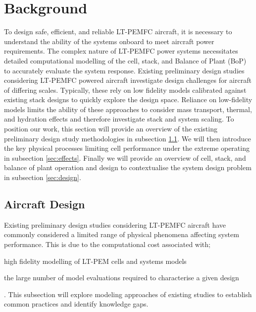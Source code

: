 \section{Background} \label{sec:background}
To design safe, efficient, and reliable LT-PEMFC aircraft, it is necessary to understand the ability of the systems onboard to meet aircraft power requirements.
The complex nature of LT-PEMFC power systems necessitates detailed computational modelling of the cell, stack, and Balance of Plant (BoP) to accurately evaluate the system response.
Existing preliminary design studies considering LT-PEMFC powered aircraft investigate design challenges for aircraft of differing scales.
Typically, these rely on low fidelity models calibrated against existing stack designs to quickly explore the design space.
Reliance on low-fidelity models limits the ability of these approaches to consider mass transport, thermal, and hydration effects and therefore investigate stack and system scaling.
To position our work, this section will provide an overview of the existing preliminary design study methodologies in subsection \ref{sec:lit}.
We will then introduce the key physical processes limiting cell performance under the extreme operating in subsection \ref{sec:effects}.
Finally we will provide an overview of cell, stack, and balance of plant operation and design to contextualise the system design problem in subsection \ref{sec:design}.

\subsection{Aircraft Design} \label{sec:lit}
Existing preliminary design studies considering LT-PEMFC aircraft have commonly considered a limited range of physical phenomena affecting system performance.
This is due to the computational cost associated with; \begin{enumerate*} \item high fidelity modelling of LT-PEM cells and systems models \item the large number of model evaluations required to characterise a given design\end{enumerate*}.
This subsection will explore modeling approaches of existing studies to establish common practices and identify knowledge gaps.

